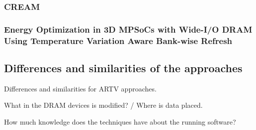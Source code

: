 \subsubsection*{\textbf{CREAM}}
\label{par:cream}



\subsubsection*{\textbf{Energy Optimization in 3D MPSoCs with Wide-I/O DRAM
Using Temperature Variation Aware Bank-wise Refresh}}
\label{par:tempaware}



\subsection{Differences and similarities of the approaches}

Differences and similarities for ARTV approaches.

What in the DRAM devices is modified? / Where is data placed.

How much knowledge does the techniques have about the running software?